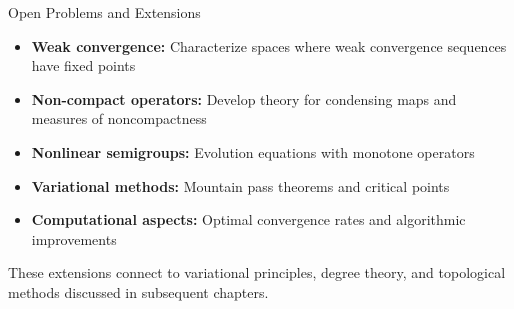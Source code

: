 \documentclass[aspectratio=169,10pt]{beamer}
\begin{document}
\begin{frame}{Open Problems and Extensions}
    \begin{itemize}
        \item \textbf{Weak convergence:} Characterize spaces where weak convergence sequences have fixed points

        \vspace{0.2cm}

        \item \textbf{Non-compact operators:} Develop theory for condensing maps and measures of noncompactness

        \vspace{0.2cm}

        \item \textbf{Nonlinear semigroups:} Evolution equations with monotone operators

        \vspace{0.2cm}

        \item \textbf{Variational methods:} Mountain pass theorems and critical points

        \vspace{0.2cm}

        \item \textbf{Computational aspects:} Optimal convergence rates and algorithmic improvements
    \end{itemize}

    \vspace{0.3cm}

    These extensions connect to variational principles, degree theory, and topological methods
    discussed in subsequent chapters.
\end{frame}
\end{document}
